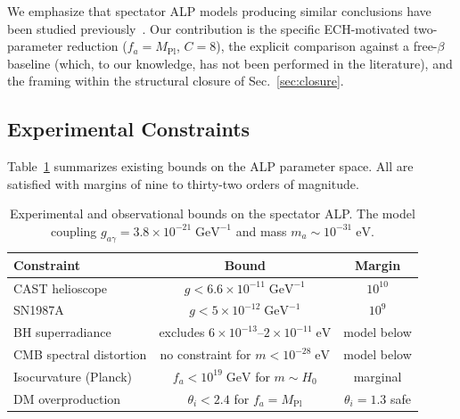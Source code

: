 We emphasize that spectator ALP models producing similar conclusions have been
studied previously~\cite{Fujita2021,Nakagawa2025}.  Our contribution is the
specific ECH-motivated two-parameter reduction ($f_a = M_\mathrm{Pl}$,
$C = 8$), the explicit comparison against a free-$\beta$ baseline (which, to
our knowledge, has not been performed in the literature), and the framing
within the structural closure of Sec.~\ref{sec:closure}.


\subsection{Experimental Constraints}
\label{sec:constraints}

Table~\ref{tab:bounds} summarizes existing bounds on the ALP parameter space.
All are satisfied with margins of nine to thirty-two orders of magnitude.

\begin{table}[h]
\centering
\caption{Experimental and observational bounds on the spectator ALP.  The
  model coupling $g_{a\gamma} = 3.8 \times 10^{-21}\;\mathrm{GeV}^{-1}$ and
  mass $m_a \sim 10^{-31}\;\mathrm{eV}$.}
\label{tab:bounds}
\begin{tabular}{lcc}
\hline\hline
Constraint & Bound & Margin \\
\hline
CAST helioscope & $g < 6.6 \times 10^{-11}\;\mathrm{GeV}^{-1}$ & $10^{10}$ \\
SN1987A & $g < 5 \times 10^{-12}\;\mathrm{GeV}^{-1}$ & $10^{9}$ \\
BH superradiance & excludes $6\times10^{-13}\text{--}2\times10^{-11}\;\mathrm{eV}$ & model below \\
CMB spectral distortion & no constraint for $m < 10^{-28}\;\mathrm{eV}$ & model below \\
Isocurvature (Planck) & $f_a < 10^{19}\;\mathrm{GeV}$ for $m \sim H_0$ & marginal \\
DM overproduction & $\theta_i < 2.4$ for $f_a = M_\mathrm{Pl}$ & $\theta_i = 1.3$ safe \\
\hline\hline
\end{tabular}
\end{table}
